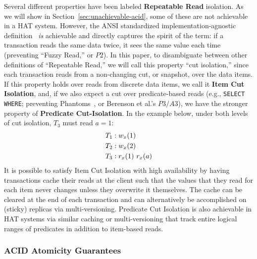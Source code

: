Several different properties have been labeled \textbf{Repeatable
  Read} isolation. As we will show in
Section~\ref{sec:unachievable-acid}, some of these are not achievable
in a HAT system. However, the ANSI standardized
implementation-agnostic definition~\cite{ansi-sql} \textit{is}
achievable and directly captures the spirit of the term: if a
transaction reads the same data twice, it sees the same value each
time (preventing ``Fuzzy Read,'' or $P2$). In this paper, to
disambiguate between other definitions of ``Repeatable Read,'' we will
call this property ``cut isolation,'' since each transaction reads
from a non-changing cut, or snapshot, over the data items. If this
property holds over reads from discrete data items, we call it
\textbf{Item Cut Isolation}, and, if we also expect a cut over
predicate-based reads (e.g., \texttt{SELECT WHERE}; preventing
Phantoms~\cite{gray-isolation}, or Berenson et al.'s $P3/A3$), we have
the stronger property of \textbf{Predicate Cut-Isolation}. In the
example below, under both levels of cut isolation, $T_3$ must read
$a=1$:
\begin{align*}
\small
T_1 &: w_x(1)
\\T_2 &: w_x(2)
\\T_3 &: r_x(1)~r_x(a)
\end{align*}
It is possible to satisfy Item Cut Isolation with high availability by
having transactions cache their reads at the client such that the
values that they read for each item never changes unless they
overwrite it themselves. The cache can be cleared at the end of each
transaction and can alternatively be accomplished on (sticky) replicas
via multi-versioning. Predicate Cut Isolation is also achievable in
HAT systems via similar caching or multi-versioning that track entire
logical ranges of predicates in addition to item-based reads.

\subsubsection{ACID Atomicity Guarantees}
\label{sec:ta}

